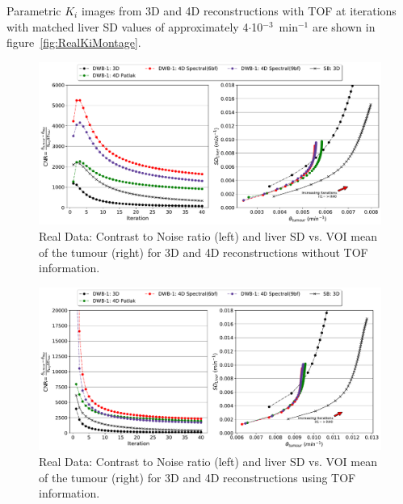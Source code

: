 Parametric $K_i$ images from 3D and 4D reconstructions with TOF at iterations with matched liver SD values of approximately 4$\cdot$10$^{-3}$~min$^{-1}$ are shown in figure~\ref{fig:RealKiMontage}.

\begin{figure} [ht!]
\centering
\includegraphics[scale=0.45,angle=0]{3_Results/3_2_Dynamic_Reconstruction_SimulationStudy/figures/RealData/3_5_tumour_Lung_NoTOF.pdf}
\caption{Real Data: Contrast to Noise ratio (left) and liver SD vs. VOI mean of the tumour (right) for 3D and 4D reconstructions without TOF information.} 
\label{fig:RealData_CNR_CoVBias_NoTOF}
\end{figure} 

\begin{figure} [ht!]
\centering
\includegraphics[scale=0.45,angle=0]{3_Results/3_2_Dynamic_Reconstruction_SimulationStudy/figures/RealData/3_5_tumour_Lung.pdf}
\caption{Real Data: Contrast to Noise ratio (left) and liver SD vs. VOI mean of the tumour (right) for 3D and 4D reconstructions using TOF information.} 
\label{fig:RealData_CNR_CoVBias}
\end{figure} 

